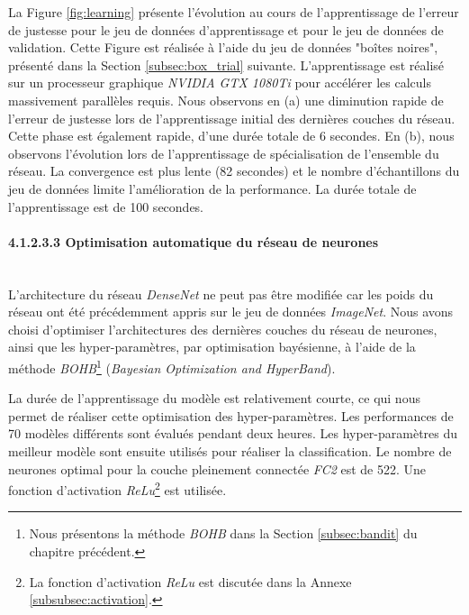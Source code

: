 La Figure \ref{fig:learning} présente l'évolution au cours de l'apprentissage de l'erreur de justesse pour le jeu de données d'apprentissage et pour le jeu de données de validation.
Cette Figure est réalisée à l'aide du jeu de données "boîtes noires", présenté dans la Section \ref{subsec:box_trial} suivante.
L'apprentissage est réalisé sur un processeur graphique \textit{NVIDIA GTX 1080Ti} pour accélérer les calculs massivement parallèles requis.
Nous observons en (a) une diminution rapide de l'erreur de justesse lors de l'apprentissage initial des dernières couches du réseau.
Cette phase est également rapide, d'une durée totale de 6 secondes.
En (b), nous observons l'évolution lors de l'apprentissage de spécialisation de l'ensemble du réseau.
La convergence est plus lente (82 secondes) et le nombre d'échantillons du jeu de données limite l'amélioration de la performance.
La durée totale de l'apprentissage est de 100 secondes.

\paragraph{4.1.2.3.3 Optimisation automatique du réseau de neurones} \mbox{} \\
L'architecture du réseau \textit{DenseNet} ne peut pas être modifiée car les poids du réseau ont été précédemment appris sur le jeu de données \textit{ImageNet}.
Nous avons choisi d'optimiser l'architectures des dernières couches du réseau de neurones, ainsi que les hyper-paramètres, par optimisation bayésienne, à l'aide de la méthode \textit{BOHB}\footnote{Nous présentons la méthode \textit{BOHB} dans la Section \ref{subsec:bandit} du chapitre précédent.} (\textit{Bayesian Optimization and HyperBand}).

La durée de l'apprentissage du modèle est relativement courte, ce qui nous permet de réaliser cette optimisation des hyper-paramètres.
Les performances de 70 modèles différents sont évalués pendant deux heures.
Les hyper-paramètres du meilleur modèle sont ensuite utilisés pour réaliser la classification.
Le nombre de neurones optimal pour la couche pleinement connectée \textit{FC2} est de 522.
Une fonction d'activation \textit{ReLu}\footnote{La fonction d'activation \textit{ReLu} est discutée dans la Annexe \ref{subsubsec:activation}.} est utilisée.


